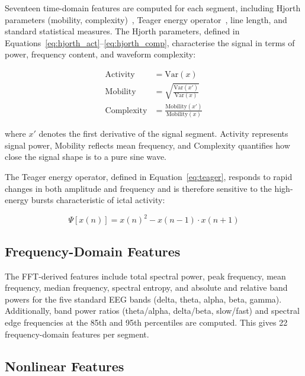 Seventeen time-domain features are computed for each segment, including Hjorth parameters (mobility, complexity)~\citep{hjorth1970eeg}, Teager energy operator~\citep{kaiser1990simple}, line length, and standard statistical measures. The Hjorth parameters, defined in Equations~\eqref{eq:hjorth_act}--\eqref{eq:hjorth_comp}, characterise the signal in terms of power, frequency content, and waveform complexity:

\begin{align}
    \text{Activity} &= \text{Var}(x) \label{eq:hjorth_act} \\[0.5em]
    \text{Mobility} &= \sqrt{\frac{\text{Var}(x')}{\text{Var}(x)}} \label{eq:hjorth_mob} \\[0.5em]
    \text{Complexity} &= \frac{\text{Mobility}(x')}{\text{Mobility}(x)} \label{eq:hjorth_comp}
\end{align}

where $x'$ denotes the first derivative of the signal segment. Activity represents signal power, Mobility reflects mean frequency, and Complexity quantifies how close the signal shape is to a pure sine wave.

The Teager energy operator, defined in Equation~\eqref{eq:teager}, responds to rapid changes in both amplitude and frequency and is therefore sensitive to the high-energy bursts characteristic of ictal activity:

\medskip
\begin{equation}
    \Psi[x(n)] = x(n)^2 - x(n-1) \cdot x(n+1)
    \label{eq:teager}
\end{equation}
\medskip

\subsection{Frequency-Domain Features}

The FFT-derived features include total spectral power, peak frequency, mean frequency, median frequency, spectral entropy, and absolute and relative band powers for the five standard EEG bands (delta, theta, alpha, beta, gamma). Additionally, band power ratios (theta/alpha, delta/beta, slow/fast) and spectral edge frequencies at the 85th and 95th percentiles are computed. This gives 22 frequency-domain features per segment.

\subsection{Nonlinear Features}

